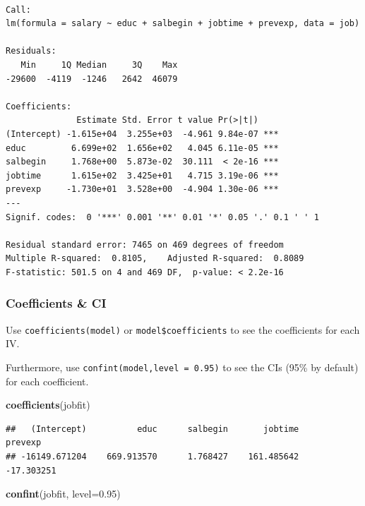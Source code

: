 \documentclass[
]{ctexart}
\newenvironment{Shaded}{\begin{snugshade}}{\end{snugshade}}
\newcommand{\AttributeTok}[1]{\textcolor[rgb]{0.13,0.29,0.53}{#1}}
\newcommand{\FloatTok}[1]{\textcolor[rgb]{0.00,0.00,0.81}{#1}}
\newcommand{\FunctionTok}[1]{\textcolor[rgb]{0.13,0.29,0.53}{\textbf{#1}}}
\newcommand{\NormalTok}[1]{#1}
\newcommand{\SpecialCharTok}[1]{\textcolor[rgb]{0.81,0.36,0.00}{\textbf{#1}}}
\begin{document}
\begin{verbatim}

Call:
lm(formula = salary ~ educ + salbegin + jobtime + prevexp, data = job)

Residuals:
   Min     1Q Median     3Q    Max 
-29600  -4119  -1246   2642  46079 

Coefficients:
              Estimate Std. Error t value Pr(>|t|)    
(Intercept) -1.615e+04  3.255e+03  -4.961 9.84e-07 ***
educ         6.699e+02  1.656e+02   4.045 6.11e-05 ***
salbegin     1.768e+00  5.873e-02  30.111  < 2e-16 ***
jobtime      1.615e+02  3.425e+01   4.715 3.19e-06 ***
prevexp     -1.730e+01  3.528e+00  -4.904 1.30e-06 ***
---
Signif. codes:  0 '***' 0.001 '**' 0.01 '*' 0.05 '.' 0.1 ' ' 1

Residual standard error: 7465 on 469 degrees of freedom
Multiple R-squared:  0.8105,    Adjusted R-squared:  0.8089 
F-statistic: 501.5 on 4 and 469 DF,  p-value: < 2.2e-16
\end{verbatim}

\hypertarget{coefficients-ci}{%
\subsubsection{Coefficients \& CI}\label{coefficients-ci}}

Use \texttt{coefficients(model)} or \texttt{model\$coefficients} to see
the coefficients for each IV.

Furthermore, use \texttt{confint(model,level\ =\ 0.95)} to see the CIs
(95\% by default) for each coefficient.

\begin{Shaded}
\end{Shaded}

\begin{Shaded}
\begin{Highlighting}[]
\FunctionTok{coefficients}\NormalTok{(jobfit)}
\end{Highlighting}
\end{Shaded}

\begin{verbatim}
##   (Intercept)          educ      salbegin       jobtime       prevexp 
## -16149.671204    669.913570      1.768427    161.485642    -17.303251
\end{verbatim}

\begin{Shaded}
\begin{Highlighting}[]
\FunctionTok{confint}\NormalTok{(jobfit, }\AttributeTok{level=}\FloatTok{0.95}\NormalTok{)}
\end{Highlighting}
\end{Shaded}
\end{document}
